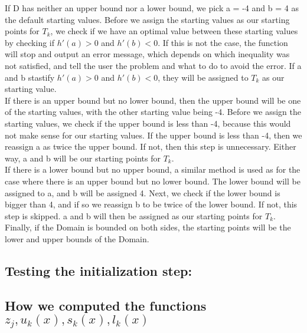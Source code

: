 \documentclass[12pt]{article}
\begin{document}
If D has neither an upper bound nor a lower bound, we pick a = -4 and b = 4 as the default starting values.  Before we assign the starting values as our starting points for $T_k$, we check if we have an optimal value between these starting values by checking if $h'(a) > 0$ and $h'(b) < 0$.  If this is not the case, the function will stop and output an error message, which depends on which inequality was not satisfied, and tell the user the problem and what to do to avoid the error.  If a and b stastify $h'(a) > 0$ and $h'(b) < 0$, they will be assigned to $T_k$ as our starting value.\\

If there is an upper bound but no lower bound, then the upper bound will be one of the starting values, with the other starting value being -4.  Before we assign the starting values, we check if the upper bound is less than -4, because this would not make sense for our starting values.  If the upper bound is less than -4, then we reassign a as twice the upper bound.  If not, then this step is unnecessary.  Either way, a and b will be our starting points for $T_k$.\\

If there is a lower bound but no upper bound, a similar method is used as for the case where there is an upper bound but no lower bound.  The lower bound will be assigned to a, and b will be assigned 4.  Next, we check if the lower bound is bigger than 4, and if so we reassign b to be twice of the lower bound. If not, this step is skipped.  a and b will then be assigned as our starting points for $T_k$.\\

Finally, if the Domain is bounded on both sides, the starting points will be the lower and upper bounds of the Domain.

\subsection*{Testing the initialization step:}


\subsection*{How we computed the functions $z_j, u_k(x), s_k(x), l_k(x)$}
\end{document}
